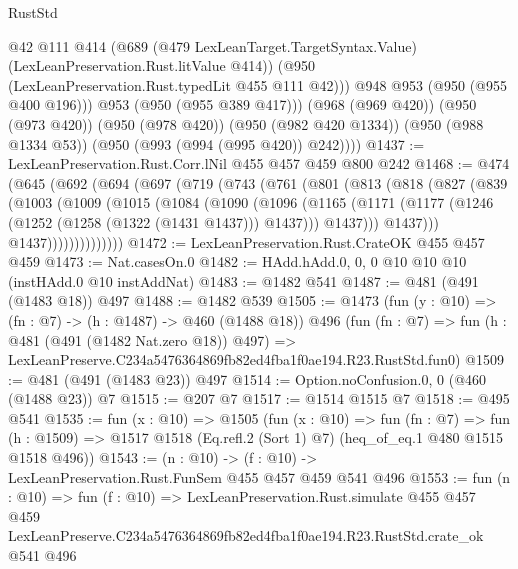 \begin{lexlean}{RustStd}
\begin{coremodule}
              @42
              @111
              @414
              (@689
                (@479 LexLeanTarget.TargetSyntax.Value)
                (LexLeanPreservation.Rust.litValue @414))
              (@950 (LexLeanPreservation.Rust.typedLit @455 @111 @42)))
            @948
            @953
            (@950 (@955 @400 @196)))
          @953
          (@950 (@955 @389 @417)))
        (@968 (@969 @420))
        (@950 (@973 @420))
        (@950 (@978 @420))
        (@950 (@982 @420 @1334))
        (@950 (@988 @1334 @53))
        (@950 (@993 (@994 (@995 @420)) @242))))
@1437 := LexLeanPreservation.Rust.Corr.lNil @455 @457 @459 @800 @242
@1468 := @474
    (@645
      (@692
        (@694
          (@697
            (@719
              (@743
                (@761
                  (@801
                    (@813
                      (@818
                        (@827
                          (@839
                            (@1003
                              (@1009
                                (@1015
                                  (@1084
                                    (@1090
                                      (@1096
                                        (@1165
                                          (@1171
                                            (@1177
                                              (@1246 (@1252 (@1258 (@1322 (@1431 @1437))) @1437)))
                                            @1437)))
                                      @1437)))
                                @1437))))))))))))))
@1472 := LexLeanPreservation.Rust.CrateOK @455 @457 @459
@1473 := Nat.casesOn.{0}
@1482 := HAdd.hAdd.{0, 0, 0} @10 @10 @10 (instHAdd.{0} @10 instAddNat)
@1483 := @1482 @541
@1487 := @481 (@491 (@1483 @18)) @497
@1488 := @1482 @539
@1505 := @1473
    (fun (y : @10) => (fn : @7) -> (h : @1487) -> @460 (@1488 @18))
    @496
    (fun (fn : @7) =>
    fun (h : @481 (@491 (@1482 Nat.zero @18)) @497) =>
    LexLeanPreserve.C234a5476364869fb82ed4fba1f0ae194.R23.RustStd.fun0)
@1509 := @481 (@491 (@1483 @23)) @497
@1514 := Option.noConfusion.{0, 0} (@460 (@1488 @23)) @7
@1515 := @207 @7
@1517 := @1514 @1515 @7
@1518 := @495 @541
@1535 := fun (x : @10) =>
  @1505
    (fun (x : @10) =>
    fun (fn : @7) =>
    fun (h : @1509) => @1517 @1518 (Eq.refl.{2} (Sort 1) @7) (heq_of_eq.{1} @480 @1515 @1518 @496))
@1543 := (n : @10) -> (f : @10) -> LexLeanPreservation.Rust.FunSem @455 @457 @459 @541 @496
@1553 := fun (n : @10) =>
  fun (f : @10) =>
  LexLeanPreservation.Rust.simulate
    @455
    @457
    @459
    LexLeanPreserve.C234a5476364869fb82ed4fba1f0ae194.R23.RustStd.crate_ok
    @541
    @496
\end{coremodule}
\end{lexlean}
